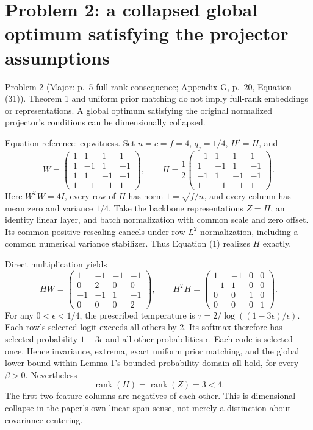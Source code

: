 \documentclass[10pt]{article}
\begin{document}
\section*{Problem 2: a collapsed global optimum satisfying the projector assumptions}
Problem 2 (Major: p. 5 full-rank consequence; Appendix G, p. 20, Equation (31)).  Theorem 1 and uniform prior matching do not imply full-rank embeddings or representations. A global optimum satisfying the original normalized projector’s conditions can be dimensionally collapsed.\par
Equation reference: eq:witness. Set \(n=c=f=4\), \(q_j=1/4\), \(H'=H\), and \[W=\begin{pmatrix}
1&1&1&1\\1&-1&1&-1\\1&1&-1&-1\\1&-1&-1&1
\end{pmatrix},\qquad
 H=\frac12\begin{pmatrix}
-1&1&1&1\\1&-1&1&-1\\-1&1&-1&-1\\1&-1&-1&1
\end{pmatrix}.
 \] Here \(W^TW=4I\), every row of \(H\) has norm \(1=\sqrt{f/n}\), and every column has mean zero and variance \(1/4\). Take the backbone representations \(Z=H\), an identity linear layer, and batch normalization with common scale and zero offset. Its common positive rescaling cancels under row \(L^2\) normalization, including a common numerical variance stabilizer. Thus Equation (1) realizes \(H\) exactly.\par
Direct multiplication yields \[HW=\begin{pmatrix}
1&-1&-1&-1\\0&2&0&0\\-1&-1&1&-1\\0&0&0&2
\end{pmatrix},\qquad
 H^TH=\begin{pmatrix}
1&-1&0&0\\-1&1&0&0\\0&0&1&0\\0&0&0&1
\end{pmatrix}.\] For any \(0<\epsilon<1/4\), the prescribed temperature is \(\tau=2/\log((1-3\epsilon)/\epsilon)\). Each row’s selected logit exceeds all others by 2. Its softmax therefore has selected probability \(1-3\epsilon\) and all other probabilities \(\epsilon\). Each code is selected once. Hence invariance, extrema, exact uniform prior matching, and the global lower bound within Lemma 1’s bounded probability domain all hold, for every \(\beta>0\). Nevertheless \[\operatorname{rank}(H)=\operatorname{rank}(Z)=3<4.\] The first two feature columns are negatives of each other. This is dimensional collapse in the paper’s own linear-span sense, not merely a distinction about covariance centering.\par
\end{document}
